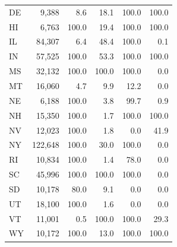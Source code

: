 \begin{table}
\begin{tabular}[t]{lrrrrr}
\hspace{1em}DE & 9,388 & 8.6 & 18.1 & 100.0 & 100.0\\
\hspace{1em}HI & 6,763 & 100.0 & 19.4 & 100.0 & 100.0\\
\hspace{1em}IL & 84,307 & 6.4 & 48.4 & 100.0 & 0.1\\
\hspace{1em}IN & 57,525 & 100.0 & 53.3 & 100.0 & 100.0\\
\hspace{1em}MS & 32,132 & 100.0 & 100.0 & 100.0 & 0.0\\
\hspace{1em}MT & 16,060 & 4.7 & 9.9 & 12.2 & 0.0\\
\hspace{1em}NE & 6,188 & 100.0 & 3.8 & 99.7 & 0.9\\
\hspace{1em}NH & 15,350 & 100.0 & 1.7 & 100.0 & 100.0\\
\hspace{1em}NV & 12,023 & 100.0 & 1.8 & 0.0 & 41.9\\
\hspace{1em}NY & 122,648 & 100.0 & 30.0 & 100.0 & 0.0\\
\hspace{1em}RI & 10,834 & 100.0 & 1.4 & 78.0 & 0.0\\
\hspace{1em}SC & 45,996 & 100.0 & 100.0 & 100.0 & 0.0\\
\hspace{1em}SD & 10,178 & 80.0 & 9.1 & 0.0 & 0.0\\
\hspace{1em}UT & 18,100 & 100.0 & 1.6 & 0.0 & 0.0\\
\hspace{1em}VT & 11,001 & 0.5 & 100.0 & 100.0 & 29.3\\
\hspace{1em}WY & 10,172 & 100.0 & 13.0 & 100.0 & 100.0\\
\bottomrule
\end{tabular}
\endgroup{}
\end{table}
